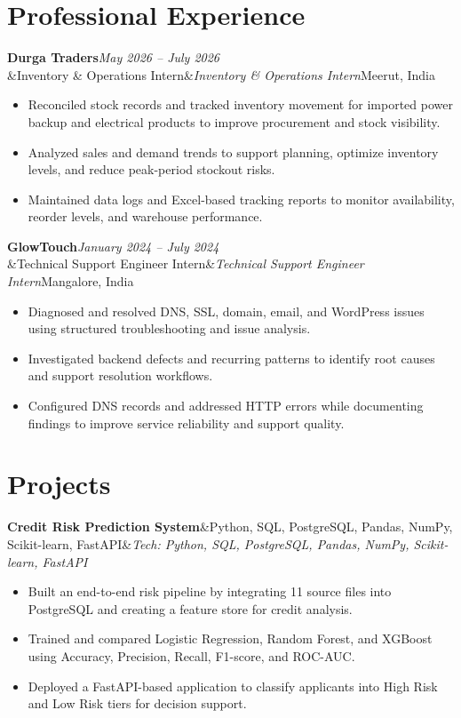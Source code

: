 \documentclass[a4paper,10pt]{article}
\newcommand{\entry}[4]{%
  \noindent\textbf{#1}\hfill\textit{#2}\\
  \ifx&#3&\else\textit{#3}\hfill\textcolor{muted}{#4}\fi\par
  \vspace{1pt}}
\newcommand{\projtitle}[2]{%
  \noindent\textbf{#1}\ifx&#2&\else\quad\textcolor{muted}{\small\textit{Tech: #2}}\fi\par}
\begin{document}
\section*{Professional Experience}
\entry{Durga Traders}{May 2026 -- July 2026}{Inventory \& Operations Intern}{Meerut, India}
\begin{itemize}
  \item Reconciled stock records and tracked inventory movement for imported power backup and electrical products to improve procurement and stock visibility.
  \item Analyzed sales and demand trends to support planning, optimize inventory levels, and reduce peak-period stockout risks.
  \item Maintained data logs and Excel-based tracking reports to monitor availability, reorder levels, and warehouse performance.
\end{itemize}
\vspace{2pt}

\entry{GlowTouch}{January 2024 -- July 2024}{Technical Support Engineer Intern}{Mangalore, India}
\begin{itemize}
  \item Diagnosed and resolved DNS, SSL, domain, email, and WordPress issues using structured troubleshooting and issue analysis.
  \item Investigated backend defects and recurring patterns to identify root causes and support resolution workflows.
  \item Configured DNS records and addressed HTTP errors while documenting findings to improve service reliability and support quality.
\end{itemize}

\section*{Projects}
\projtitle{Credit Risk Prediction System}{Python, SQL, PostgreSQL, Pandas, NumPy, Scikit-learn, FastAPI}
\begin{itemize}
  \item Built an end-to-end risk pipeline by integrating 11 source files into PostgreSQL and creating a feature store for credit analysis.
  \item Trained and compared Logistic Regression, Random Forest, and XGBoost using Accuracy, Precision, Recall, F1-score, and ROC-AUC.
  \item Deployed a FastAPI-based application to classify applicants into High Risk and Low Risk tiers for decision support.
\end{itemize}
\vspace{2pt}
\end{document}
